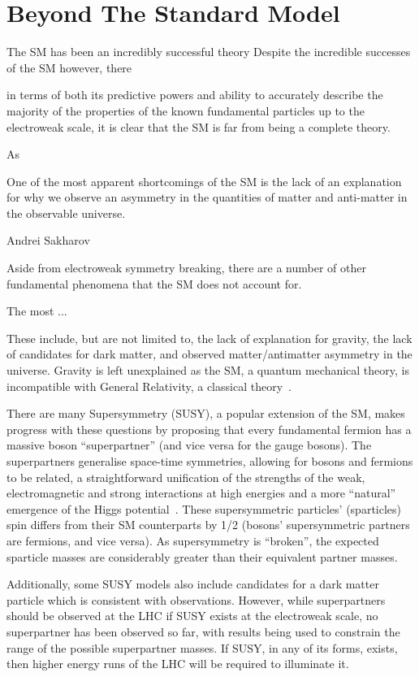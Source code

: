 \section{Beyond The Standard Model}\label{sec:bsm}
The SM has been an incredibly successful theory
Despite the incredible successes of the SM however, there  

 in terms of both its predictive powers and ability to accurately describe the majority of the properties of the known fundamental particles up to the electroweak scale, it is clear that the SM is far from being a complete theory. 

As 

One of the most apparent shortcomings of the SM is the lack of an explanation for why we observe an asymmetry in the quantities of matter and anti-matter in the observable universe.

Andrei Sakharov 

Aside from electroweak symmetry breaking, there are a number of other fundamental phenomena that the SM does not account for. 

The most ...  

These include, but are not limited to, the lack of explanation for gravity, the lack of candidates for dark matter, and observed matter/antimatter asymmetry in the universe. 
Gravity is left unexplained as the SM, a quantum mechanical theory, is incompatible with General Relativity, a classical theory~\cite{Khalil:2003vd}. 



There are many 
Supersymmetry (SUSY), a popular extension of the SM, makes progress with these questions by proposing that every fundamental fermion has a massive boson ``superpartner'' (and vice versa for the gauge bosons). 
The superpartners generalise space-time symmetries, allowing for bosons and fermions to be related, a straightforward unification of the strengths of the weak, electromagnetic and strong interactions at high energies and a more ``natural'' emergence of the Higgs potential~\cite{Khalil:2003vd}. 
These supersymmetric particles' (sparticles) spin differs from their SM counterparts by 1/2 (\ie bosons' supersymmetric partners are fermions, and vice versa). 
As supersymmetry is ``broken'', the expected sparticle masses are considerably greater than their equivalent partner masses. 

Additionally, some SUSY models also include candidates for a dark matter particle which is consistent with observations. 
However, while superpartners should be observed at the LHC if SUSY exists at the electroweak scale, no superpartner has been observed so far, with results being used to constrain the range of the possible superpartner masses. 
If SUSY, in any of its forms, exists, then higher energy runs of the LHC will be required to illuminate it.

